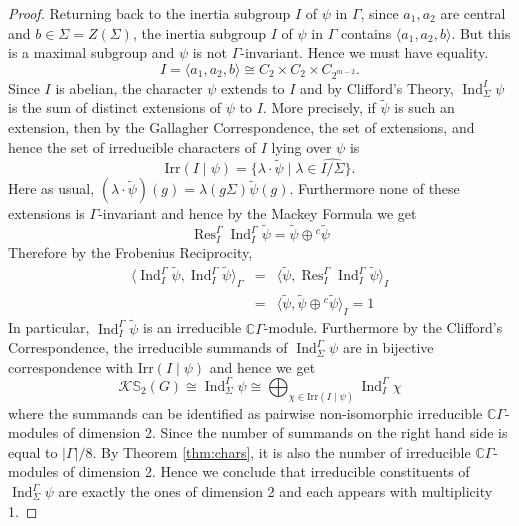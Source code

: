 \documentclass[12pt]{article}
\theoremstyle{plain}
\theoremstyle{definition}
\newcommand{\kerlint}{\mathbb S_2}
\newcommand{\ind}{\operatorname{Ind}}
\newcommand{\res}{\operatorname{Res}}
\begin{document}
\begin{proof}
Returning back to the inertia subgroup $I$ of $\psi$ in $\Gamma$, since $a_1, a_2$ are central and $b\in\Sigma=Z(\Sigma)$, the inertia subgroup $I$ of $\psi$ in $\Gamma$ contains $\langle a_1, a_2, b\rangle$.
But this is a maximal subgroup and $\psi$ is not $\Gamma$-invariant. Hence we must have equality.
\[
I = \langle a_1, a_2, b\rangle \cong C_2\times C_2\times C_{2^{m-2}}.
\]
 Since $I$ is abelian, the character $\psi$ extends to $I$ and by Clifford's Theory, $\ind_\Sigma^I\psi$ is the sum of distinct extensions of $\psi$ to $I$. More precisely, if $\tilde\psi$ is such an extension, then by the Gallagher Correspondence, the set of extensions, and  
hence the set of  irreducible characters of $I$ lying over $\psi$ is
\[
\text{Irr}(I\mid \psi) = \{ \lambda\cdot\tilde\psi \mid \lambda\in\widehat{I/\Sigma} \}.
\]
Here as usual, $(\lambda\cdot \tilde\psi)(g) = \lambda(g\Sigma)\tilde\psi(g)$.
Furthermore none of these extensions is $\Gamma$-invariant and hence by the Mackey Formula we get
\[
\res^\Gamma_I\ind_I^\Gamma \tilde\psi = \tilde\psi \oplus {}^c\tilde\psi
\]
Therefore by the Frobenius Reciprocity,
\begin{eqnarray*}
    \big\langle \ind_I^\Gamma\tilde\psi, \ind_I^\Gamma\tilde\psi\big\rangle_\Gamma &=&     \big\langle \tilde\psi, \res^\Gamma_I\ind_I^\Gamma\tilde\psi\big\rangle_I\\
    &=&     \big\langle \tilde\psi, \tilde\psi \oplus {}^c\tilde\psi\big\rangle_I = 1
\end{eqnarray*}
In particular, $\ind_I^\Gamma\tilde\psi$ is an irreducible $\mathbb C\Gamma$-module. Furthermore by the Clifford's Correspondence, the irreducible summands of $\ind_\Sigma^\Gamma\psi$ are in bijective correspondence with $\text{Irr}(I\mid \psi)$ and hence we get
\[
\mathcal K\kerlint(G) \cong \ind_\Sigma^\Gamma\psi \cong \bigoplus_{\chi\in\text{Irr}(I\mid \psi)}\ind_I^\Gamma \chi
\]
where the summands can be identified as pairwise non-isomorphic irreducible $\mathbb C\Gamma$-modules of dimension 2. Since the number of summands on the right hand side is equal to $|\Gamma|/8$. By Theorem \ref{thm:chars}, it is also the number of irreducible $\mathbb C\Gamma$-modules of dimension 2. Hence we conclude that irreducible constituents of $\ind_\Sigma^\Gamma\psi$ are exactly the ones of dimension 2 and each appears with multiplicity 1. 
\end{proof}
\end{document}
